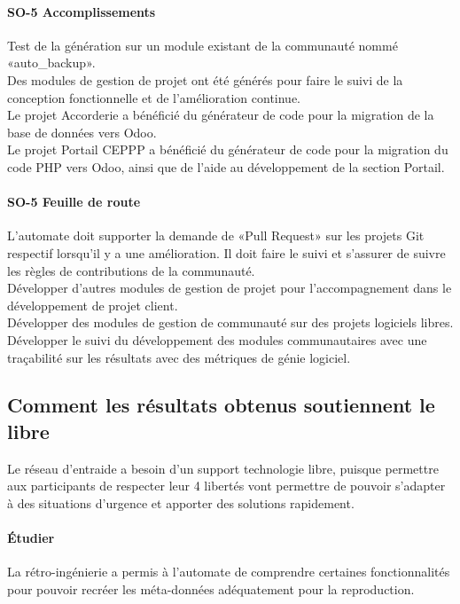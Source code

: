 \paragraph{SO-5 Accomplissements}
Test de la génération sur un module existant de la communauté nommé «auto\_backup».\\
Des modules de gestion de projet ont été générés pour faire le suivi de la conception fonctionnelle et de l’amélioration continue.\\
Le projet Accorderie a bénéficié du générateur de code pour la migration de la base de données vers Odoo.\\
Le projet Portail CEPPP a bénéficié du générateur de code pour la migration du code PHP vers Odoo, ainsi que de l’aide au développement de la section Portail.

\paragraph{SO-5 Feuille de route}
L’automate doit supporter la demande de «Pull Request» sur les projets Git respectif lorsqu’il y a une amélioration. Il doit faire le suivi et s’assurer de suivre les règles de contributions de la communauté.\\
Développer d’autres modules de gestion de projet pour l’accompagnement dans le développement de projet client.\\
Développer des modules de gestion de communauté sur des projets logiciels libres.\\
Développer le suivi du développement des modules communautaires avec une traçabilité sur les résultats avec des métriques de génie logiciel.

\subsection{Comment les résultats obtenus soutiennent le libre}

Le réseau d’entraide a besoin d’un support technologie libre, puisque permettre aux participants de respecter leur 4 libertés vont permettre de pouvoir s’adapter à des situations d’urgence et apporter des solutions rapidement.

\paragraph{Étudier}
La rétro-ingénierie a permis à l’automate de comprendre certaines fonctionnalités pour pouvoir recréer les méta-données adéquatement pour la reproduction.

